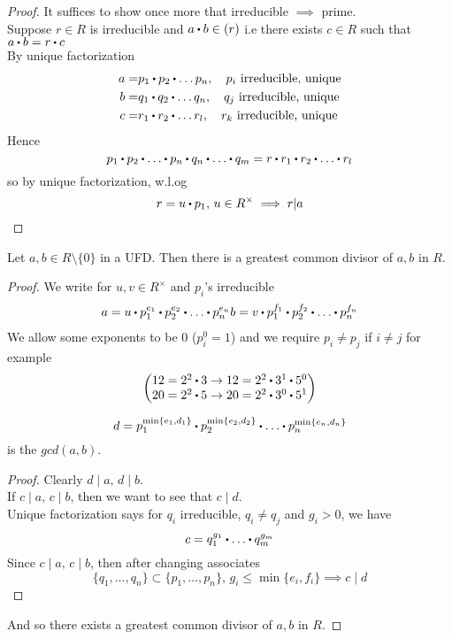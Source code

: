 \documentclass[../Main.tex]{subfiles}
\begin{document}
\begin{proof}
	It suffices to show once more that irreducible $\implies$ prime.\\
	Suppose $r\in R$ is irreducible and $a\rdot b\in (r)$ i.e there exists $c\in R$ such that $a\rdot b=r\rdot c$\\
	By unique factorization
	\begin{align*}
	a=&p_1\rdot p_2\rdot \dots p_n,\quad p_i \text{ irreducible, unique}\\
	b=&q_1\rdot q_2\rdot \dots q_n,\quad q_j \text{ irreducible, unique}\\
	c=&r_1\rdot r_2\rdot \dots r_l,\quad r_k \text{ irreducible, unique}
	\end{align*}
	Hence
	\[p_1\rdot p_2\rdot \dots \rdot p_n \rdot q_n \rdot \dots \rdot q_m = r \rdot r_1 \rdot r_2\rdot  \dots \rdot r_l\]
	so by unique factorization, w.l.og
	\[r=u\rdot p_1,\, u\in R^\times \implies r|a\]
\end{proof}
\begin{prop}[title=Nonzero elements in UFD have GCD]
	Let $a,b\in R\setminus \{0\}$ in a UFD. Then there is a greatest common divisor of $a,b$ in $R$.
\end{prop}
\begin{proof}
	We write for $u,v\in R^\times$ and $p_i$'s irreducible
	\begin{align*}
	a=u\rdot p_1^{e_1}\rdot p_2^{e_2}\rdot \dots \rdot p_n^{e_n}
	b=v\rdot p_1^{f_1}\rdot p_2^{f_2}\rdot \dots \rdot p_n^{f_n}
	\end{align*}
	We allow some exponents to be $0$ ($p_i^0=1$) and we require $p_i\ne p_j$ if $i\ne j$ for example
	\[\begin{pmatrix}
	12=2^2\rdot 3 \to 12= 2^2\rdot 3^1\rdot 5^0 \\
	20=2^2\rdot 5 \to 20 =2^2\rdot 3^0\rdot 5^1 
	\end{pmatrix}\]
	\begin{claim}
		\[d=p_1^{\min\{e_1,d_1\}}\rdot p_2^{\min\{e_2,d_2\}}\rdot \dots \rdot p_n^{\min\{e_n,d_n\}}\]
		is the $gcd(a,b)$.
	\end{claim}
	\begin{proof}
		Clearly $d\mid a,\, d\mid b$.\\
		If $c\mid a, \, c\mid b$, then we want to see that $c\mid d$.\\
		Unique factorization says for $q_i$ irreducible, $q_i\ne q_j$ and $g_i>0$, we have
		\[c=q_1^{g_1}\rdot \dots \rdot q_m^{g_m}\]
		Since $c\mid a,\, c\mid b$, then after changing associates
		\[\{q_1,\dots,q_n\}\subset \{p_1,\dots,p_n\}, \, g_i\le \min\{e_i,f_i\}\implies c\mid d\]
	\end{proof}
	And so there exists a greatest common divisor of $a,b$ in $R$.
\end{proof}
\end{document}
